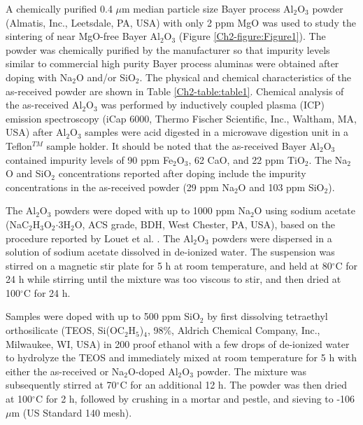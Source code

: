 A chemically purified 0.4 $\mu$m median particle size Bayer process Al$_{2}$O$_{3}$ powder (Almatis, Inc., Leetsdale, PA, USA) with only 2 ppm MgO was used to study the sintering of near MgO-free Bayer Al$_{2}$O$_{3}$ (Figure \ref{Ch2-figure:Figure1}). The powder was chemically purified by the manufacturer so that impurity levels similar to commercial high purity Bayer process aluminas were obtained after doping with Na$_{2}$O and/or SiO$_{2}$. The physical and chemical characteristics of the as-received powder are shown in Table \ref{Ch2-table:table1}. Chemical analysis of the as-received Al$_{2}$O$_{3}$ was performed by inductively coupled plasma (ICP) emission spectroscopy (iCap 6000, Thermo Fischer Scientific, Inc., Waltham, MA, USA) after Al$_{2}$O$_{3}$ samples were acid digested in a microwave digestion unit in a Teflon$^{TM}$ sample holder.  It should be noted that the as-received Bayer Al$_{2}$O$_{3}$ contained impurity levels of 90 ppm Fe$_{2}$O$_{3}$, 62 CaO, and 22 ppm TiO$_{2}$.  The Na$_{2}$O and SiO$_{2}$ concentrations reported after doping include the impurity concentrations in the as-received powder (29 ppm Na$_{2}$O and 103 ppm SiO$_{2}$). 

The Al$_{2}$O$_{3}$ powders were doped with up to 1000 ppm Na$_{2}$O using sodium acetate (NaC$_{2}$H$_{3}$O$_{2}$$\cdot$3H$_{2}$O, ACS grade, BDH, West Chester, PA, USA), based on the procedure reported by Louet et al. \cite{Louet2005a}. The Al$_{2}$O$_{3}$ powders were dispersed in a solution of sodium acetate dissolved in de-ionized water. The suspension was stirred on a magnetic stir plate for 5 h at room temperature, and held at 80$^{\circ}$C for 24 h while stirring until the mixture was too viscous to stir, and then dried at 100$^{\circ}$C for 24 h. 

Samples were doped with up to 500 ppm SiO$_{2}$ by first dissolving tetraethyl orthosilicate (TEOS, Si(OC$_{2}$H$_{5}$)$_{4}$, 98\%, Aldrich Chemical Company, Inc., Milwaukee, WI, USA) in 200 proof ethanol with a few drops of de-ionized water to hydrolyze the TEOS and immediately mixed at room temperature for 5 h with either the as-received or Na$_{2}$O-doped Al$_{2}$O$_{3}$ powder. The mixture was subsequently stirred at 70$^{\circ}$C for an additional 12 h. The powder was then dried at 100$^{\circ}$C for 2 h, followed by crushing in a mortar and pestle, and sieving to -106 $\mu$m (US Standard 140 mesh).


